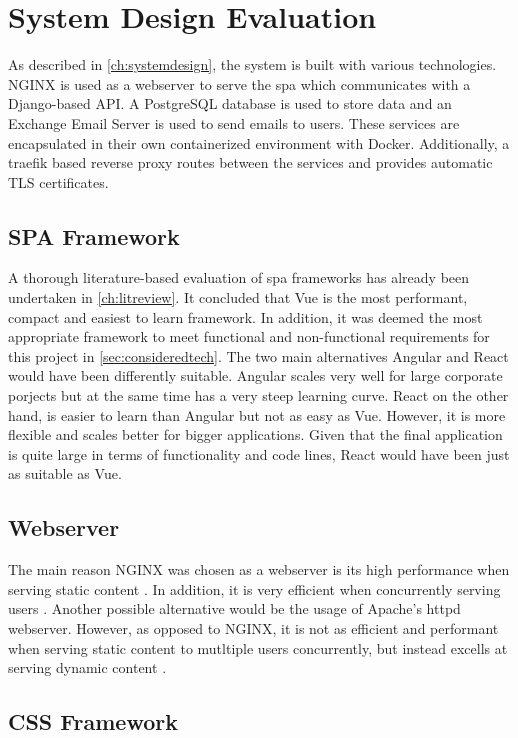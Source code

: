 \section{System Design Evaluation}
As described in \autoref{ch:systemdesign}, the system is built with various technologies. NGINX is used as a webserver to serve the \acrshort{spa} which communicates with a Django-based API. A PostgreSQL database is used to store data and an Exchange Email Server is used to send emails to users. These services are encapsulated in their own containerized environment with Docker. Additionally, a traefik based reverse proxy routes between the services and provides automatic TLS certificates.

\subsection{SPA Framework}
A thorough literature-based evaluation of \acrshort{spa} frameworks has already been undertaken in \autoref{ch:litreview}. It concluded that Vue is the most performant, compact and easiest to learn framework. In addition, it was deemed the most appropriate framework to meet functional and non-functional requirements for this project in \autoref{sec:consideredtech}. The two main alternatives Angular and React would have been differently suitable. Angular scales very well for large corporate porjects but at the same time has a very steep learning curve. React on the other hand, is easier to learn than Angular but not as easy as Vue. However, it is more flexible and scales better for bigger applications. Given that the final application is quite large in terms of functionality and code lines, React would have been just as suitable as Vue.

\subsection{Webserver}
The main reason NGINX was chosen as a webserver is its high performance when serving static content \cite{NGINXvsApache:online}. In addition, it is very efficient when concurrently serving users \cite{NGINXvsApache:online}. Another possible alternative would be the usage of Apache's httpd webserver. However, as opposed to NGINX, it is not as efficient and performant when serving static content to mutltiple users concurrently, but instead excells at serving dynamic content \cite{NGINXvsApache:online}.

\subsection{CSS Framework}

